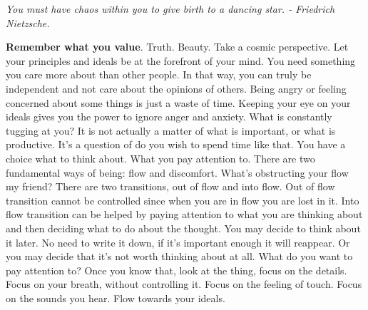 \documentclass[a4paper,hidelinks]{article}
\begin{document}


\begin{center}
\textit{You must have chaos within you to give birth to a dancing star. - Friedrich Nietzsche.}
\end{center}

\textbf{Remember what you value}.
Truth.
Beauty.
Take a cosmic perspective.
Let your principles and ideals be at the forefront of your mind.
You need something you care more about than other people.
In that way, you can truly be independent and not care about the opinions of others.
Being angry or feeling concerned about some things is just a waste of time.
Keeping your eye on your ideals gives you the power to ignore anger and anxiety.
What is constantly tugging at you?
It is not actually a matter of what is important, or what is productive.
It's a question of do you wish to spend time like that.
You have a choice what to think about.
What you pay attention to.
There are two fundamental ways of being: flow and discomfort.
What's obstructing your flow my friend?
There are two transitions, out of flow and into flow.
Out of flow transition cannot be controlled since when you are in flow you are lost in it.
Into flow transition can be helped by paying attention to what you are thinking about and then deciding what to do about the thought.
You may decide to think about it later.
No need to write it down, if it's important enough it will reappear.
Or you may decide that it's not worth thinking about at all.
What do you want to pay attention to?
Once you know that, look at the thing, focus on the details.
Focus on your breath, without controlling it.
Focus on the feeling of touch.
Focus on the sounds you hear.
Flow towards your ideals.
\end{document}
